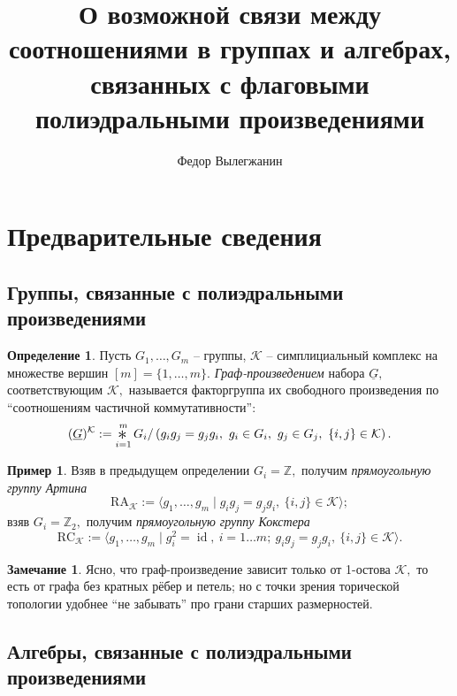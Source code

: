 \documentclass[10pt,a4paper]{article}
\author{Федор Вылегжанин}
\title{О возможной связи между соотношениями в группах и алгебрах, связанных с флаговыми полиэдральными произведениями}
\date{}
\newcommand{\Bigast}{\mathop{\scalebox{1.5}{\raisebox{-0.2ex}{$\ast$}}}}%
\DeclareMathOperator{\id}{id}
\def\ZZ{\mathbb{Z}}
\def\RC{\mathrm{RC}}
\def\RA{\mathrm{RA}}
\def\K{\mathcal{K}}
\theoremstyle{definition}
\newtheorem{dfn}[thm]{Определение}
\newtheorem{rmk}[thm]{Замечание}
\newtheorem{exm}[thm]{Пример}
\begin{document}
\maketitle


\section{Предварительные сведения}
\subsection{Группы, связанные с полиэдральными произведениями}
\begin{dfn}
Пусть $G_1,\dots,G_m$ -- группы, $\K$ -- симплициальный комплекс на множестве вершин $[m]=\{1,\dots,m\}$. \emph{Граф-произведением} набора $\underline{G},$ соответствующим $\K,$ называется факторгруппа их свободного произведения по ``соотношениям частичной коммутативности'':
$$(\underline{G})^\K:=\Bigast_{i=1}^m G_i /\left(g_ig_j=g_jg_i,~g_i\in G_i,~g_j\in G_j,~\{i,j\}\in\K\right).$$
\end{dfn}

\begin{exm} Взяв в предыдущем определении $G_i=\ZZ,$ получим \emph{прямоугольную группу Артина}
$$\RA_\K:=\langle g_1,\dots, g_m\mid g_ig_j=g_jg_i,~\{i,j\}\in\K\rangle;$$
взяв
$G_i=\ZZ_2,$ получим \emph{прямоугольную группу Кокстера}
$$\RC_\K:=\langle g_1,\dots, g_m\mid g_i^2=\id,~i=1\dots m;~g_ig_j=g_jg_i,~\{i,j\}\in\K\rangle.$$
\end{exm}
\begin{rmk}
Ясно, что граф-произведение зависит только от 1-остова $\K,$ то есть от графа без кратных рёбер и петель; но с точки зрения торической топологии удобнее ``не забывать'' про грани старших размерностей.
\end{rmk}
\subsection{Алгебры, связанные с полиэдральными произведениями}
\end{document}
